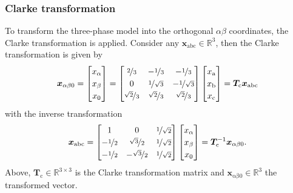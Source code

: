\begin{frame}
	\frametitle{Clarke transformation}
    To transform the three-phase model into the orthogonal $\alpha\beta$ coordinates, the Clarke transformation is applied. Consider any $\bm{x}_\mathrm{abc}\in\mathbb{R}^3$, then the Clarke transformation is given by
    \begin{equation}
        \renewcommand{\arraystretch}{1.2}
        \bm{x}_{\alpha \beta0} = \begin{bmatrix} x_\alpha \\ x_\beta \\ x_0\end{bmatrix} = \begin{bmatrix}
            \nicefrac{2}{3} & -\nicefrac{1}{3} & -\nicefrac{1}{3}\\
            0 & \nicefrac{1}{\sqrt{3}} & -\nicefrac{1}{\sqrt{3}}\\
            \nicefrac{\sqrt{2}}{3} & \nicefrac{\sqrt{2}}{3} & \nicefrac{\sqrt{2}}{3}
        \end{bmatrix} \begin{bmatrix} x_\mathrm{a} \\ x_\mathrm{b} \\ x_\mathrm{c}\end{bmatrix} = \bm{T}_\mathrm{c} \bm{x}_\mathrm{abc} 
        \label{eq:Clarke_transformation}
    \end{equation}
    with the inverse transformation
    \begin{equation}
        \renewcommand{\arraystretch}{1.2}
        \bm{x}_\mathrm{abc}  = \begin{bmatrix}
            1 & 0 & \nicefrac{1}{\sqrt{2}}\\
            -\nicefrac{1}{2} & \nicefrac{\sqrt{3}}{2} & \nicefrac{1}{\sqrt{2}}\\
            -\nicefrac{1}{2} & -\nicefrac{\sqrt{3}}{2} & \nicefrac{1}{\sqrt{2}}
        \end{bmatrix} \begin{bmatrix} x_\alpha \\ x_\beta \\ x_0\end{bmatrix} = \bm{T}_\mathrm{c}^{-1} \bm{x}_{\alpha \beta 0}.
    \end{equation}
    Above, $\bm{T}_\mathrm{c}\in\mathbb{R}^{3\times 3}$ is the Clarke transformation matrix and $\bm{x}_\mathrm{\alpha \beta0}\in\mathbb{R}^3$ the transformed vector.
\end{frame}

